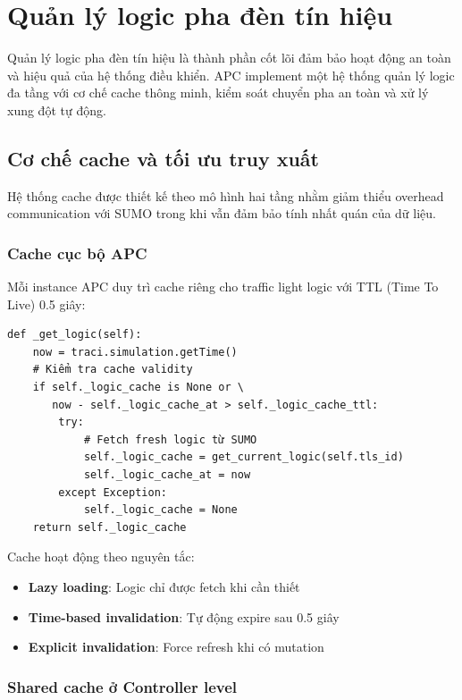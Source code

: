 \section{Quản lý logic pha đèn tín hiệu}

Quản lý logic pha đèn tín hiệu là thành phần cốt lõi đảm bảo hoạt động an toàn và hiệu quả của hệ thống điều khiển. APC implement một hệ thống quản lý logic đa tầng với cơ chế cache thông minh, kiểm soát chuyển pha an toàn và xử lý xung đột tự động.

\subsection{Cơ chế cache và tối ưu truy xuất}

Hệ thống cache được thiết kế theo mô hình hai tầng nhằm giảm thiểu overhead communication với SUMO trong khi vẫn đảm bảo tính nhất quán của dữ liệu.

\subsubsection{Cache cục bộ APC}

Mỗi instance APC duy trì cache riêng cho traffic light logic với TTL (Time To Live) 0.5 giây:

\begin{lstlisting}[style=py, caption={Implementation của logic cache cục bộ}]
def _get_logic(self):
    now = traci.simulation.getTime()
    # Kiểm tra cache validity
    if self._logic_cache is None or \
       now - self._logic_cache_at > self._logic_cache_ttl:
        try:
            # Fetch fresh logic từ SUMO
            self._logic_cache = get_current_logic(self.tls_id)
            self._logic_cache_at = now
        except Exception:
            self._logic_cache = None
    return self._logic_cache
\end{lstlisting}

Cache hoạt động theo nguyên tắc:
\begin{itemize}
    \item \textbf{Lazy loading}: Logic chỉ được fetch khi cần thiết
    \item \textbf{Time-based invalidation}: Tự động expire sau 0.5 giây
    \item \textbf{Explicit invalidation}: Force refresh khi có mutation
\end{itemize}

\subsubsection{Shared cache ở Controller level}

